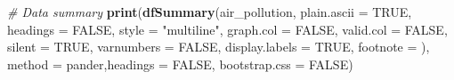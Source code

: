 \documentclass[
]{article}
\newenvironment{Shaded}{\begin{snugshade}}{\end{snugshade}}
\newcommand{\AttributeTok}[1]{\textcolor[rgb]{0.13,0.29,0.53}{#1}}
\newcommand{\CommentTok}[1]{\textcolor[rgb]{0.56,0.35,0.01}{\textit{#1}}}
\newcommand{\ConstantTok}[1]{\textcolor[rgb]{0.56,0.35,0.01}{#1}}
\newcommand{\FunctionTok}[1]{\textcolor[rgb]{0.13,0.29,0.53}{\textbf{#1}}}
\newcommand{\NormalTok}[1]{#1}
\newcommand{\StringTok}[1]{\textcolor[rgb]{0.31,0.60,0.02}{#1}}
\begin{document}
\begin{Shaded}
\begin{Highlighting}[]
\CommentTok{\# Data summary}
\FunctionTok{print}\NormalTok{(}\FunctionTok{dfSummary}\NormalTok{(air\_pollution, }\AttributeTok{plain.ascii  =} \ConstantTok{TRUE}\NormalTok{,  }\AttributeTok{headings     =} \ConstantTok{FALSE}\NormalTok{,}
          \AttributeTok{style        =} \StringTok{"multiline"}\NormalTok{, }
          \AttributeTok{graph.col    =} \ConstantTok{FALSE}\NormalTok{, }
          \AttributeTok{valid.col    =} \ConstantTok{FALSE}\NormalTok{, }\AttributeTok{silent =} \ConstantTok{TRUE}\NormalTok{, }\AttributeTok{varnumbers =} \ConstantTok{FALSE}\NormalTok{, }\AttributeTok{display.labels =} \ConstantTok{TRUE}\NormalTok{, }\AttributeTok{footnote =} \StringTok{\textquotesingle{}\textquotesingle{}}\NormalTok{), }\AttributeTok{method =} \StringTok{\textquotesingle{}pander\textquotesingle{}}\NormalTok{,}\AttributeTok{headings =} \ConstantTok{FALSE}\NormalTok{,     }
          \AttributeTok{bootstrap.css =} \ConstantTok{FALSE}\NormalTok{)}
\end{Highlighting}
\end{Shaded}
\end{document}
